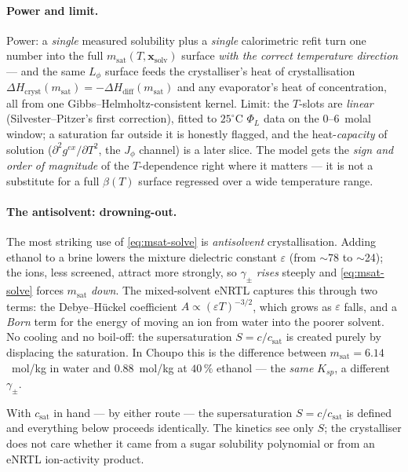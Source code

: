 \documentclass[11pt,a4paper]{article}
\begin{document}
\paragraph{Power and limit.}  Power: a \emph{single} measured solubility
plus a \emph{single} calorimetric refit turn one number into the full
$m_{\text{sat}}(T,\mathbf{x}_{\text{solv}})$ surface \emph{with the correct
temperature direction} --- and the same $L_\phi$ surface feeds the
crystalliser's heat of crystallisation
$\Delta H_{\text{cryst}}(m_{\text{sat}})=-\Delta H_{\text{diff}}(m_{\text{sat}})$
and any evaporator's heat of concentration, all from one
Gibbs--Helmholtz-consistent kernel.  Limit: the $T$-slots are
\emph{linear} (Silvester--Pitzer's first correction), fitted to $25^\circ$C
$\Phi_L$ data on the $0$--$6$~molal window; a saturation far outside it is
honestly flagged, and the heat-\emph{capacity} of solution
($\partial^2 g^{ex}/\partial T^2$, the $J_\phi$ channel) is a later slice.
The model gets the \emph{sign and order of magnitude} of the
$T$-dependence right where it matters --- it is not a substitute for a
full $\beta(T)$ surface regressed over a wide temperature range.

\paragraph{The antisolvent: drowning-out.}  The most striking use of
\eqref{eq:msat-solve} is \emph{antisolvent} crystallisation.  Adding
ethanol to a brine lowers the mixture dielectric constant $\varepsilon$
(from $\sim$78 to $\sim$24); the ions, less screened, attract more
strongly, so $\gamma_\pm$ \emph{rises} steeply and \eqref{eq:msat-solve}
forces $m_{\text{sat}}$ \emph{down}.  The mixed-solvent eNRTL captures this
through two terms: the Debye--H\"uckel coefficient
$A\propto(\varepsilon T)^{-3/2}$, which grows as $\varepsilon$ falls, and a
\emph{Born} term for the energy of moving an ion from water into the
poorer solvent.  No cooling and no boil-off: the supersaturation
$S=c/c_{\text{sat}}$ is created purely by displacing the saturation.  In
Choupo this is the difference between $m_{\text{sat}}=6.14$~mol/kg in water
and $0.88$~mol/kg at $40\,\%$ ethanol --- the \emph{same} $K_{sp}$, a
different $\gamma_\pm$.

\medskip
With $c_{\text{sat}}$ in hand --- by either route --- the supersaturation
$S=c/c_{\text{sat}}$ is defined and everything below proceeds identically.
The kinetics see only $S$; the crystalliser does not care whether it came
from a sugar solubility polynomial or from an eNRTL ion-activity product.
\end{document}
